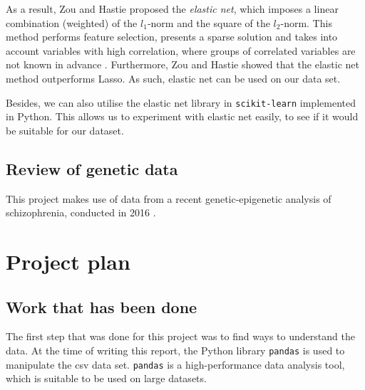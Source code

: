 \documentclass[12pt, twoside, a4paper]{article}
\begin{document}
As a result, Zou and Hastie proposed the \textit{elastic net}, which imposes a linear combination (weighted) of the $l_1$-norm and the square of the $l_2$-norm. This method performs feature selection, presents a sparse solution and takes into account variables with high correlation, where groups of correlated variables are not known in advance \cite{RefWorks:93}. Furthermore, Zou and Hastie showed that the elastic net method outperforms Lasso. As such, elastic net can be used on our data set.

Besides, we can also utilise the elastic net library in \texttt{scikit-learn} implemented in Python. This allows us to experiment with elastic net easily, to see if it would be suitable for our dataset.


\subsection{Review of genetic data} \label{bg_genetic_data}
This project makes use of data from a recent genetic-epigenetic analysis of schizophrenia, conducted in 2016 \cite{RefWorks:78}.



\section{Project plan}



\subsection{Work that has been done}

The first step that was done for this project was to find ways to understand the data. At the time of writing this report, the Python library \texttt{pandas} is used to manipulate the csv data set. \texttt{pandas} is a high-performance data analysis tool, which is suitable to be used on large datasets.
\end{document}
